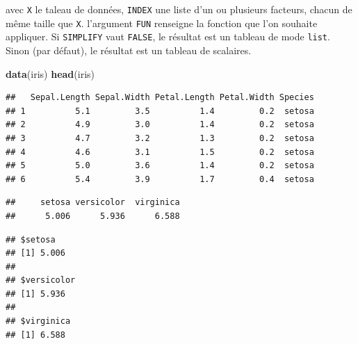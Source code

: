 \documentclass[
  11pt,
]{book}
\newenvironment{Shaded}{\begin{snugshade}}{\end{snugshade}}
\newcommand{\CommentTok}[1]{\textcolor[rgb]{0.56,0.35,0.01}{\textit{#1}}}
\newcommand{\DataTypeTok}[1]{\textcolor[rgb]{0.13,0.29,0.53}{#1}}
\newcommand{\KeywordTok}[1]{\textcolor[rgb]{0.13,0.29,0.53}{\textbf{#1}}}
\newcommand{\NormalTok}[1]{#1}
\newcommand{\OperatorTok}[1]{\textcolor[rgb]{0.81,0.36,0.00}{\textbf{#1}}}
\newcommand{\OtherTok}[1]{\textcolor[rgb]{0.56,0.35,0.01}{#1}}
\numberwithin{equation}{section}
\numberwithin{countremarque}{section}
\begin{document}
avec \texttt{X} le taleau de données, \texttt{INDEX} une liste d'un ou plusieurs facteurs, chacun de même taille que \texttt{X}. l'argument \texttt{FUN} renseigne la fonction que l'on souhaite appliquer. Si \texttt{SIMPLIFY} vaut \texttt{FALSE}, le résultat est un tableau de mode \texttt{list}. Sinon (par défaut), le résultat est un tableau de scalaires.

\begin{Shaded}
\begin{Highlighting}[]
\KeywordTok{data}\NormalTok{(iris)}
\KeywordTok{head}\NormalTok{(iris)}
\end{Highlighting}
\end{Shaded}

\begin{lstlisting}
##   Sepal.Length Sepal.Width Petal.Length Petal.Width Species
## 1          5.1         3.5          1.4         0.2  setosa
## 2          4.9         3.0          1.4         0.2  setosa
## 3          4.7         3.2          1.3         0.2  setosa
## 4          4.6         3.1          1.5         0.2  setosa
## 5          5.0         3.6          1.4         0.2  setosa
## 6          5.4         3.9          1.7         0.4  setosa
\end{lstlisting}

\begin{Shaded}
\end{Shaded}

\begin{lstlisting}
##     setosa versicolor  virginica 
##      5.006      5.936      6.588
\end{lstlisting}

\begin{Shaded}
\end{Shaded}

\begin{lstlisting}
## $setosa
## [1] 5.006
## 
## $versicolor
## [1] 5.936
## 
## $virginica
## [1] 6.588
\end{lstlisting}
\end{document}
